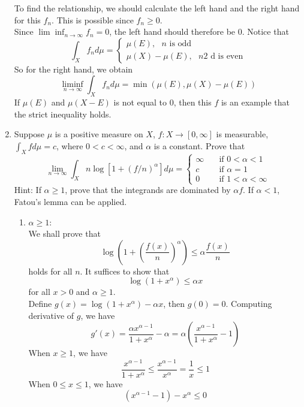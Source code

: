 \documentclass{article}
\begin{document}
\begin{enumerate}
 	To find the relationship, we should calculate the left hand and the right hand for this $f_n$. This is possible since $f_n\geq0$.\\
 	Since $\lim\inf_{n\to\infty}f_n=0$, the left hand should therefore be $0$. Notice that
 	\[
 		\int_Xf_nd\mu=\begin{cases}
 		\mu(E),\text{ $n$ is odd}\\
 		\mu(X)-\mu(E),\text{ $n$2 d is even}
 		\end{cases}
 	\]
 	So for the right hand, we obtain
 	\[
 	\liminf_{n\to\infty}\int_Xf_nd\mu=\min(\mu(E),\mu(X)-\mu(E))
 	\]
 	If $\mu(E)$ and $\mu(X-E)$ is not equal to $0$, then this $f$ is an example that the strict inequality holds.
 	\item \exercise Suppose $\mu$ is a positive measure on $X$, $f:X\to[0,\infty]$ is measurable, $\int_Xfd\mu=c$, where $0<c<\infty$, and $\alpha$ is a constant. Prove that
 	\[
 		\lim\limits_{n\to\infty}\int_{X}n\log[1+(f/n)^{\alpha}]d\mu=\begin{cases}
 		\infty&\quad\text{if }0<\alpha<1\\
 		c&\quad\text{if }\alpha=1\\
 		0&\quad\text{if }1<\alpha<\infty
 		\end{cases}
 	\]
 	Hint: If $\alpha\geq1$, prove that the integrands are dominated by $\alpha f$. If $\alpha<1$, Fatou's lemma can be applied.\\
 	\solution
 	\begin{enumerate}
 		\item $\alpha\geq{1}$:\\
 			We shall prove that
 			\[
 				\log\left(1+\left(\frac{f(x)}{n}\right)^{\alpha}\right)\leq\alpha\frac{f(x)}{n}
 			\]
 			holds for all $n$.
 			It suffices to show that
 			\[
 				\log(1+x^{\alpha})\leq\alpha{x}
 			\]
 			for all $x>0$ and $\alpha\geq{1}$.\\
 			Define $g(x)=\log(1+x^{\alpha})-\alpha{x}$, then $g(0)=0$. Computing derivative of $g$, we have
 			\[
 				g'(x)=\frac{\alpha{x^{\alpha-1}}}{1+x^{\alpha}}-\alpha=\alpha(\frac{x^{\alpha-1}}{1+x^{\alpha}}-1)
 			\]
 			When $x\geq{1}$, we have 
 			\begin{equation}
 				\frac{x^{\alpha-1}}{1+x^{\alpha}}\leq\frac{x^{\alpha-1}}{x^{\alpha}}=\frac{1}{x}\leq{1}
 			\end{equation}
 			When $0\leq{x}\leq{1}$, we have
 			\begin{equation}
	 			(x^{\alpha-1}-1)-x^{\alpha}\leq{0}
 			\end{equation}

\end{enumerate}
\end{enumerate}
\end{document}
